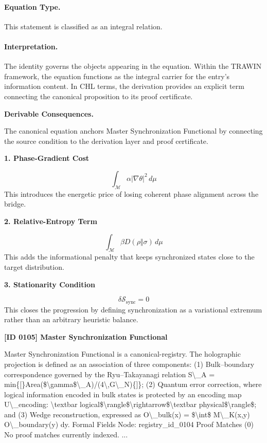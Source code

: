 \paragraph{Equation Type.}
This statement is classified as an integral relation.

\paragraph{Interpretation.}
The identity governs the objects appearing in the equation. Within the TRAWIN framework, the equation functions as the integral carrier for the entry’s information content. In CHL terms, the derivation provides an explicit term connecting the canonical proposition to its proof certificate.

\par\vspace{0.35em}
\noindent\textbf{Derivable Consequences.}\quad
\begingroup
\footnotesize
\raggedright
The canonical equation anchors Master Synchronization Functional by connecting the source condition to the derivation layer and proof certificate.
\par\endgroup

\noindent\textbf{1. Phase-Gradient Cost}\par
\[
\int_{\mathcal{M}} \alpha \lvert \nabla \theta \rvert^2\, d\mu
\]
\noindent This introduces the energetic price of losing coherent phase alignment across the bridge.\par
\noindent\textbf{2. Relative-Entropy Term}\par
\[
\int_{\mathcal{M}} \beta D(\rho\Vert\sigma)\, d\mu
\]
\noindent This adds the informational penalty that keeps synchronized states close to the target distribution.\par
\noindent\textbf{3. Stationarity Condition}\par
\[
\delta \mathcal{S}_{\mathrm{sync}} = 0
\]
\noindent This closes the progression by defining synchronization as a variational extremum rather than an arbitrary heuristic balance.\par

\clearpage
\noindent\textbf{[ID 0105] Master Synchronization Functional}\par
\vspace{0.35em}
\begingroup\small
{}
Master Synchronization Functional is a canonical-registry. The holographic projection is defined as an association of three components: (1) Bulk--boundary correspondence governed by the Ryu--Takayanagi relation S\textbackslash{}\_A = min\{[\}Area(\$\textbackslash{}gamma\$\textbackslash{}\_A)/(4\textbackslash{},G\textbackslash{}\_N)\{]\}; (2) Quantum error correction, where logical information encoded in bulk states is protected by an encoding map U\textbackslash{}\_encoding: \textbackslash{}textbar logical\$\textbackslash{}rangle\$\textbackslash{}rightarrow\$\textbackslash{}textbar physical\$\textbackslash{}rangle\$; and (3) Wedge reconstruction, expressed as O\textbackslash{}\_bulk(x) = \$\textbackslash{}int\$ M\textbackslash{}\_K(x,y) O\textbackslash{}\_boundary(y) dy. Formal Fields Node: registry\_id\_0104 Proof Matches (0) No proof matches currently indexed. ...

